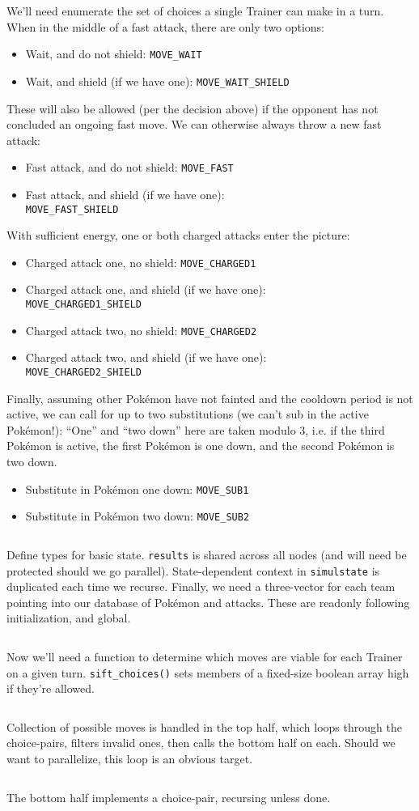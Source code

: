We'll need enumerate the set of choices a single Trainer can make in a turn.
When in the middle of a fast attack, there are only two options:
\begin{itemize}
\item Wait, and do not shield: \texttt{MOVE\_WAIT}
\item Wait, and shield (if we have one): \texttt{MOVE\_WAIT\_SHIELD}
\end{itemize}
These will also be allowed (per the decision above) if the opponent has not concluded an ongoing fast move.
We can otherwise always throw a new fast attack:
\begin{itemize}
\item Fast attack, and do not shield: \texttt{MOVE\_FAST}
\item Fast attack, and shield (if we have one):\\
  \texttt{MOVE\_FAST\_SHIELD}
\end{itemize}
With sufficient energy, one or both charged attacks enter the picture:
\begin{itemize}
\item Charged attack one, no shield: \texttt{MOVE\_CHARGED1}
\item Charged attack one, and shield (if we have one):\\
  \texttt{MOVE\_CHARGED1\_SHIELD}
\item Charged attack two, no shield: \texttt{MOVE\_CHARGED2}
\item Charged attack two, and shield (if we have one):\\
  \texttt{MOVE\_CHARGED2\_SHIELD}
\end{itemize}
Finally, assuming other Pokémon have not fainted and the cooldown period is not active,
 we can call for up to two substitutions (we can't sub in the active Pokémon!):
``One'' and ``two down'' here are taken modulo 3,
 i.e. if the third Pokémon is active, the first Pokémon is one down,
 and the second Pokémon is two down.
\begin{itemize}
\item Substitute in Pokémon one down: \texttt{MOVE\_SUB1}
\item Substitute in Pokémon two down: \texttt{MOVE\_SUB2}
\end{itemize}
\inputminted{cpp}{s/moves.h}
Define types for basic state.
\texttt{results} is shared across all nodes (and will need be protected should we go parallel).
State-dependent context in \texttt{simulstate} is duplicated each time we recurse.
Finally, we need a three-vector for each team pointing into our database of Pokémon and attacks.
These are readonly following initialization, and global.
\inputminted{cpp}{s/simul.h}
Now we'll need a function to determine which moves are viable for each Trainer on a given turn.
\texttt{sift\_choices()} sets members of a fixed-size boolean array high if they're allowed.
\inputminted{cpp}{s/sift.h}
Collection of possible moves is handled in the top half, which loops through the choice-pairs,
  filters invalid ones, then calls the bottom half on each.
Should we want to parallelize, this loop is an obvious target.
\inputminted{cpp}{s/top.h}
The bottom half implements a choice-pair, recursing unless done.
\inputminted{cpp}{s/bottom.h}
